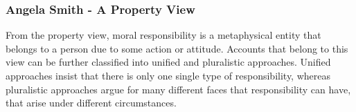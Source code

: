\documentclass{article}
\begin{document}





%
%
%

\subsubsection{Angela Smith - A Property View}
\label{smith}

From the property view, moral responsibility is a metaphysical entity that
belongs to a person due to some action or attitude. Accounts that belong to this
view can be further classified into unified and pluralistic approaches. Unified
approaches insist that there is only one single type of responsibility, whereas
pluralistic approaches argue for many different faces that responsibility can
have, that arise under different circumstances.\\
\end{document}
